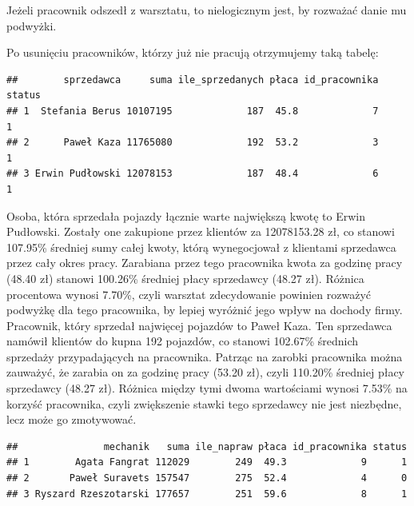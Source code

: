 \documentclass{article}\usepackage[]{graphicx}\usepackage[]{xcolor}
\makeatletter
\newenvironment{kframe}{%
 \def\at@end@of@kframe{}%
 \ifinner\ifhmode%
  \def\at@end@of@kframe{\end{minipage}}%
  \begin{minipage}{\columnwidth}%
 \fi\fi%
 \def\FrameCommand##1{\hskip\@totalleftmargin \hskip-\fboxsep
 \colorbox{shadecolor}{##1}\hskip-\fboxsep
     \hskip-\linewidth \hskip-\@totalleftmargin \hskip\columnwidth}%
 \MakeFramed {\advance\hsize-\width
   \@totalleftmargin\z@ \linewidth\hsize
   \@setminipage}}%
 {\par\unskip\endMakeFramed%
 \at@end@of@kframe}
\newenvironment{knitrout}{}{} %
\makeatother
\begin{document}
Jeżeli pracownik odszedł z warsztatu, to nielogicznym jest, by rozważać danie mu podwyżki.

Po usunięciu pracowników, którzy już nie pracują otrzymujemy taką tabelę:

\begin{knitrout}
\color{fgcolor}\begin{kframe}
\begin{verbatim}
##        sprzedawca     suma ile_sprzedanych płaca id_pracownika status
## 1  Stefania Berus 10107195             187  45.8             7      1
## 2      Paweł Kaza 11765080             192  53.2             3      1
## 3 Erwin Pudłowski 12078153             187  48.4             6      1
\end{verbatim}
\end{kframe}
\end{knitrout}

Osoba, która sprzedała pojazdy łącznie warte największą kwotę to Erwin Pudłowski. Zostały one zakupione przez klientów za 12078153.28 zł, co stanowi 107.95\% średniej sumy całej kwoty, którą wynegocjował z klientami sprzedawca przez cały okres pracy. Zarabiana przez tego pracownika kwota za godzinę pracy (48.40 zł) stanowi 100.26\% średniej płacy sprzedawcy (48.27 zł). Różnica procentowa wynosi 7.70\%, czyli warsztat zdecydowanie powinien rozważyć podwyżkę dla tego pracownika, by lepiej wyróżnić jego wpływ na dochody firmy. \\

Pracownik, który sprzedał najwięcej pojazdów to Paweł Kaza. Ten sprzedawca namówił klientów do kupna 192 pojazdów, co stanowi 102.67\% średnich sprzedaży przypadających na pracownika. Patrząc na zarobki pracownika można zauważyć, że zarabia on za godzinę pracy (53.20 zł), czyli 110.20\% średniej płacy sprzedawcy (48.27 zł). Różnica między tymi dwoma wartościami wynosi 7.53\% na korzyść pracownika, czyli zwiększenie stawki tego sprzedawcy nie jest niezbędne, lecz może go zmotywować. 

\begin{knitrout}
\color{fgcolor}\begin{kframe}
\begin{verbatim}
##               mechanik   suma ile_napraw płaca id_pracownika status
## 1        Agata Fangrat 112029        249  49.3             9      1
## 2       Paweł Suravets 157547        275  52.4             4      0
## 3 Ryszard Rzeszotarski 177657        251  59.6             8      1
\end{verbatim}
\end{kframe}
\end{knitrout}
\end{document}
